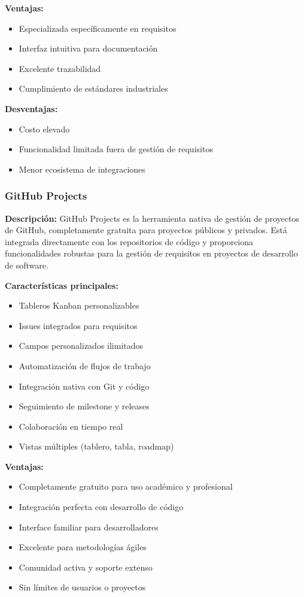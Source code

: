 \documentclass[12pt,a4paper]{article}
\begin{document}
\textbf{Ventajas:}
\begin{itemize}
    \item Especializada específicamente en requisitos
    \item Interfaz intuitiva para documentación
    \item Excelente trazabilidad
    \item Cumplimiento de estándares industriales
\end{itemize}

\textbf{Desventajas:}
\begin{itemize}
    \item Costo elevado
    \item Funcionalidad limitada fuera de gestión de requisitos
    \item Menor ecosistema de integraciones
\end{itemize}

\subsubsection{GitHub Projects}

\textbf{Descripción:}
GitHub Projects es la herramienta nativa de gestión de proyectos de GitHub, completamente gratuita para proyectos públicos y privados. Está integrada directamente con los repositorios de código y proporciona funcionalidades robustas para la gestión de requisitos en proyectos de desarrollo de software.

\textbf{Características principales:}
\begin{itemize}
    \item Tableros Kanban personalizables
    \item Issues integrados para requisitos
    \item Campos personalizados ilimitados
    \item Automatización de flujos de trabajo
    \item Integración nativa con Git y código
    \item Seguimiento de milestone y releases
    \item Colaboración en tiempo real
    \item Vistas múltiples (tablero, tabla, roadmap)
\end{itemize}

\textbf{Ventajas:}
\begin{itemize}
    \item Completamente gratuito para uso académico y profesional
    \item Integración perfecta con desarrollo de código
    \item Interface familiar para desarrolladores
    \item Excelente para metodologías ágiles
    \item Comunidad activa y soporte extenso
    \item Sin límites de usuarios o proyectos
\end{itemize}
\end{document}
